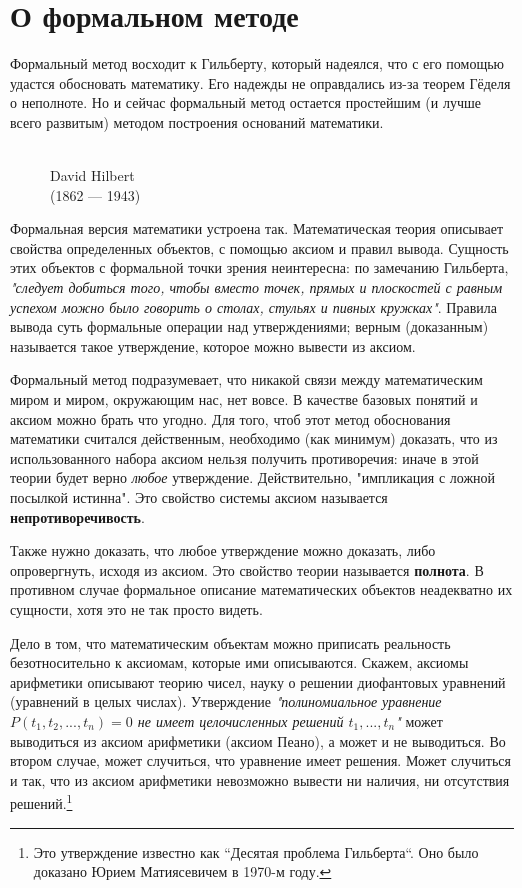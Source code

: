 \documentclass[12pt]{book}
\theoremstyle{upshape}
\theoremstyle{generic}
\def\еза{\end{remark}}
\theoremstyle{upshapenonumber}
\newcommand{\следствие}{%
     \refstepcounter{teorema}
     {\noindent\bf Следствие \thechapter.\arabic{teorema}:\ }}
\newcommand{\пример}{%
     \refstepcounter{teorema}
     {\noindent\bf Пример \thechapter.\arabic{teorema}:\ }}
\newcommand{\лемма}{%
     \refstepcounter{teorema}
     {\noindent\bf Лемма \thechapter.\arabic{teorema}:\ }}
\newcommand{\теорема}{%
     \refstepcounter{teorema}
     {\noindent\bf Теорема \thechapter.\arabic{teorema}:\ }}
\newcommand{\утверждение}{%
     \refstepcounter{teorema}
     {\noindent\bf Утверждение \thechapter.\arabic{teorema}:\ }}
\def\бф{\bf}
\def\ем{\em}
\def\ез{\end{zadacha}}
\def\еу{\end{ukazanie}}
\def\ео{\end{opredelenie}}
\def\енум{\begin{enumerate}}
\def\ее{\end{enumerate}}
\begin{document}
\section{О формальном методе}

Формальный метод восходит к Гильберту,
который надеялся, что с его помощью удастся обосновать
математику. Его надежды не оправдались из-за теорем
Гёделя о неполноте. Но и сейчас формальный метод остается простейшим
(и лучше всего развитым) методом построения оснований
математики.

\begin{figure}[ht]
\begin{center}
\\
{David Hilbert\\
(1862 --- 1943)}
\end{center}
\end{figure}



Формальная версия математики устроена так. 
Математическая теория описывает свойства
определенных объектов, с помощью аксиом
и правил вывода. Сущность этих объектов
с формальной точки зрения неинтересна:
по замечанию Гильберта, {\ем "следует добиться 
того, чтобы вместо точек, прямых и плоскостей с
равным успехом можно было говорить о столах, 
стульях и пивных кружках"}. Правила вывода
суть формальные операции над утверждениями;
верным (доказанным) называется такое 
утверждение, которое можно вывести из аксиом. 

Формальный метод подразумевает, что никакой
связи между математическим миром и миром, окружающим
нас, нет вовсе. В качестве базовых понятий и аксиом
можно брать что угодно. Для того, чтоб этот метод 
обоснования математики считался действенным, необходимо 
(как минимум) доказать, что из использованного 
набора аксиом нельзя получить противоречия:
иначе в этой теории будет верно {\ем любое}
утверждение. Действительно, "импликация
с ложной посылкой истинна". Это свойство
системы аксиом называется {\бф непротиворечивость}.

Также нужно доказать, что любое утверждение
можно доказать, либо опровергнуть, исходя из аксиом.
Это свойство теории называется {\бф полнота}. 
В противном случае формальное описание математических
объектов неадекватно их сущности, хотя это не так
просто видеть.

Дело в том, что математическим объектам можно 
приписать реальность безотносительно к аксиомам,
которые ими описываются. Скажем, аксиомы арифметики
описывают теорию чисел, науку о решении диофантовых
уравнений (уравнений в целых числах). 
Утверждение {\ем "полиномиальное уравнение $P(t_1, t_2, ..., t_n)=0$ 
не имеет целочисленных решений $t_1, ..., t_n$"} 
может выводиться из аксиом арифметики (аксиом
Пеано), а может и не выводиться. Во втором случае,
может случиться, что уравнение имеет решения.
Может случиться и так, что
из аксиом арифметики невозможно  вывести ни
наличия, ни отсутствия решений.\footnote{Это
утверждение известно как ``Десятая проблема Гильберта``.
Оно было доказано  Юрием Матиясевичем в 1970-м году.}
\end{document}

